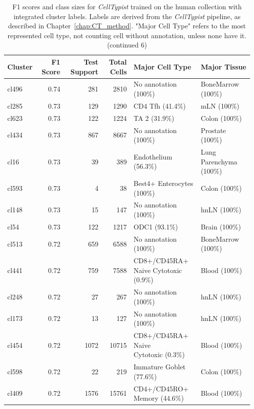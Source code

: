 \begin{table}[ht!]
\scriptsize
\caption[F1 scores and class sizes for \textit{CellTypist} trained on the human collection with integrated cluster labels (continued 6)]{F1 scores and class sizes for \textit{CellTypist} trained on the human collection with integrated cluster labels. Labels are derived from the \textit{CellTypist} pipeline, as described in Chapter~\ref{chap:CT_method}. "Major Cell Type" refers to the most represented cell type, not counting cell without annotation, unless none have it. (continued 6)}
\centering
\label{table:tab_HAmodelclust6}
\begin{tabular}{lrrrll}
  \toprule
Cluster & F1 Score & Test Support & Total Cells & Major Cell Type & Major Tissue \\ 
  \midrule  
  cl496 & 0.74 & 281 & 2810 & No annotation (100\%) & BoneMarrow (100\%) \\ 
  cl285 & 0.73 & 129 & 1290 & CD4 Tfh (41.4\%) & mLN (100\%) \\ 
  cl623 & 0.73 & 122 & 1224 & TA 2 (31.9\%) & Colon (100\%) \\ 
  cl434 & 0.73 & 867 & 8667 & No annotation (100\%) & Prostate (100\%) \\ 
  cl16 & 0.73 &  39 & 389 & Endothelium (56.3\%) & Lung Parenchyma (100\%) \\ 
  cl593 & 0.73 &   4 &  38 & Best4+ Enterocytes (100\%) & Colon (100\%) \\ 
  cl148 & 0.73 &  15 & 147 & No annotation (100\%) & hnLN (100\%) \\ 
  cl54 & 0.73 & 122 & 1217 & ODC1 (93.1\%) & Brain (100\%) \\ 
  cl513 & 0.72 & 659 & 6588 & No annotation (100\%) & BoneMarrow (100\%) \\ 
  cl441 & 0.72 & 759 & 7588 & \specialcell[t]{CD8+/CD45RA+\\Naive Cytotoxic (0.9\%)} & Blood (100\%) \\ 
  cl248 & 0.72 &  27 & 267 & No annotation (100\%) & hnLN (100\%) \\ 
  cl173 & 0.72 &  13 & 127 & No annotation (100\%) & hnLN (100\%) \\ 
  cl454 & 0.72 & 1072 & 10715 & \specialcell[t]{CD8+/CD45RA+ Naive\\Cytotoxic (0.3\%)} & Blood (100\%) \\ 
  cl598 & 0.72 &  22 & 219 & Immature Goblet (77.6\%) & Colon (100\%) \\ 
  cl409 & 0.72 & 1576 & 15761 & \specialcell[t]{CD4+/CD45RO+\\Memory (44.6\%)} & Blood (100\%) \\ 

\end{tabular}
\end{table}
